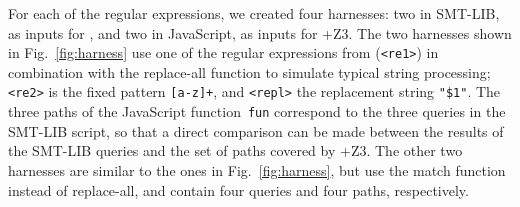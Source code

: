 For each of the regular expressions, we created four harnesses: two in
SMT-LIB, as inputs for \ostrich, and two in JavaScript, as inputs for
\expose{}+Z3. The two harnesses shown in Fig.~\ref{fig:harness} use one of the
regular expressions from \cite{DMC+19} (\verb!<re1>!) in combination with
the replace-all function to simulate typical string processing;
\verb!<re2>! is the fixed pattern \verb![a-z]+!, and \verb!<repl>! the
replacement string \verb!"$1"!. The three paths of the JavaScript
function~\verb!fun! correspond to the three queries in the SMT-LIB
script, so that a direct comparison can be made between the results of
the SMT-LIB queries and the set of paths covered by \expose{}+Z3. The other
two harnesses are similar to the ones in Fig.~\ref{fig:harness}, but
use the match function instead of replace-all, and contain four
queries and four paths, respectively.

